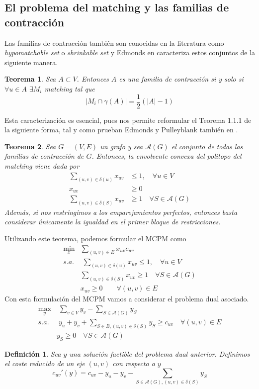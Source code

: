 \documentclass[twoside,a4paper,openright,12pt,tikz]{book}
\newtheorem{defi}{Definici\'on}[section]
\newtheorem{thm}{Teorema}[section]
\begin{document}
\subsection{El problema del matching y las familias de contracción}
Las familias de contracción también son conocidas en la literatura como \textit{hypomatchable set} o \textit{shrinkable set} y Edmonds en \cite{edmon3} caracteriza estos conjuntos de la siguiente manera.
\begin{thm}
Sea $A \subset V$. Entonces $A$ es una familia de contracción si y solo si $\forall u \in A$ $\exists M_i$ matching tal que 
$$
|M_i\cap \gamma(A)| = \frac{1}{2}(|A|-1)
$$
\end{thm}
Esta caracterización es esencial, pues nos permite reformular el Teorema 1.1.1 de la siguiente forma, tal y como prueban Edmonds y Pulleyblank también en \cite{edmon3}.
\begin{thm}
Sea $G=(V,E)$ un grafo y sea $\mathcal{A}(G)$ el conjunto de todas las familias de contracción de $G$. Entonces, la envolvente convexa del politopo del matching viene dada por
\begin{align*}
\sum_{(u,v)\in\delta(u)} x_{uv} &\leq 1, \quad \forall u\in V\\
x_{uv} &\geq 0\\
\sum_{(u,v)\in \delta(S)} x_{uv}& \geq 1 \quad \forall S \in \mathcal{A}(G)	
\end{align*}
Además, si nos restringimos a los emparejamientos perfectos, entonces basta considerar únicamente la igualdad en el primer bloque de restricciones.
\end{thm}
Utilizando este teorema, podemos formular el MCPM como
\begin{align*}
\min_x & \sum_{(u,v) \in E}x_{uv}c_{uv}\\
s.a.&\;\sum_{(u,v)\in\delta(u)} x_{uv} \leq 1, \quad \forall u \in V\\
&\sum_{(u,v)\in \delta(S)} x_{uv} \geq 1\quad \forall S \in \mathcal{A}(G)	\\
&x_{uv} \geq 0 \qquad \forall(u,v)\in E
\end{align*}
Con esta formulación del MCPM vamos a considerar el problema dual asociado.
\begin{align*}
\max_{y} &\; \sum_{v\in V} y_v - \sum_{S\in \mathcal{A}(G)} y_S\\
s.a.&\;y_u+y_v + \sum_{S\in B,(u,v)\in \delta(S)}y_S  \geq c_{uv} \quad \forall (u,v)\in E\\
&y_S\geq 0 \quad \forall S\in \mathcal{A}(G)
\end{align*}
\begin{defi}
Sea $y$ una solución factible del problema dual anterior. Definimos el coste reducido de un eje $(u,v)$ con respecto a $y$
$$
c_{uv}'(y) = c_{uv} - y_u -y_v - \sum_{S\in \mathcal{A}(G),(u,v)\in \delta(S)} y_S
$$ 

\end{defi}
\end{document}
